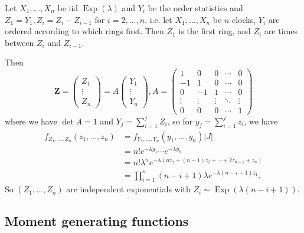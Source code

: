 \begin{example}
    Let $X_1,\ldots,X_n$ be iid $\operatorname{Exp}(\lambda)$ and $Y_i$ be the order statistics and $Z_1=Y_1,Z_i=Z_i-Z_{i-1}$ for $i=2,\ldots,n$.
    i.e. let $X_1,\dots,X_n$ be $n$ clocks, $Y_i$ are ordered according to which rings first. Then $Z_1$ is the first ring, and $ Z_i $ are times between $ Z_i $ and $ Z_{i-1} $.

    Then
    $$\mathbf{Z}=\begin{pmatrix}
        Z_1\\
        \vdots\\
        Z_n
    \end{pmatrix}=A\begin{pmatrix}
        Y_1\\
        \vdots\\
        Y_n
    \end{pmatrix},A=\begin{pmatrix}
        1&0&0&\cdots&0\\
        -1&1&0&\cdots&0\\
        0&-1&1&\cdots&0\\
        \vdots&\vdots&\vdots&\ddots&\vdots\\
        0&0&0&\cdots&1
    \end{pmatrix}$$
    where we have $\det A=1$ and $Y_j=\sum_{i=1}^jZ_i$, so for $y_j=\sum_{i=1}^jz_i$, we have
    \begin{align*}
        f_{Z_1,\ldots,Z_n}(z_1,\ldots,z_n)&=f_{Y_1,\ldots,Y_n}(y_1,\ldots,y_n)|J|\\
        &=n!e^{-\lambda y_1}\cdots e^{-\lambda y_n}\\
        &=n!\lambda^ne^{-\lambda(nz_1+(n-1)z_2+\cdots +2z_{n-1}+z_n)}\\
        &=\prod_{i=1}^n(n-i+1)\lambda e^{-\lambda(n-i+1)z_1}.
    \end{align*}
    So $(Z_1,\ldots,Z_n)$ are independent exponentials with $Z_i\sim\operatorname{Exp}(\lambda(n-i+1))$.
\end{example}

\subsection{Moment generating functions}
